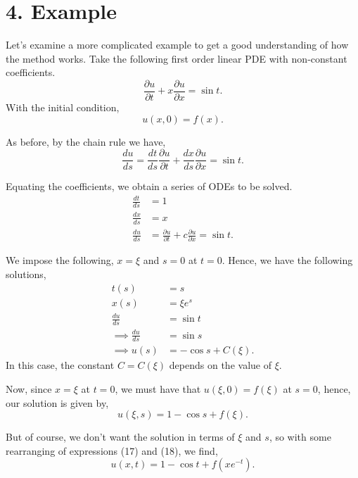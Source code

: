 \documentclass[11pt]{article}
\begin{document}
\section*{4. Example}
Let's examine a more complicated example to get a good understanding of how the method works. Take the following first order linear PDE with non-constant coefficients.
\begin{equation}
    \frac{\partial u}{\partial t} + x \frac{\partial u}{\partial x} = \sin t.
\end{equation}
With the initial condition,
\begin{equation}
    u(x,0) = f(x).
\end{equation}

As before, by the chain rule we have,
\begin{equation}
    \frac{du}{ds} = \frac{dt}{ds} \frac{\partial u}{\partial t} + \frac{dx}{ds} \frac{\partial u}{\partial x} = \sin t.
\end{equation}

Equating the coefficients, we obtain a series of ODEs to be solved.
\begin{align}
    \frac{dt}{ds} &= 1 \\
    \frac{dx}{ds} &= x \\
    \frac{du}{ds} &= \frac{\partial u}{\partial t} + c \frac{\partial u}{\partial x} = \sin t.
\end{align}

We impose the following, $x= \xi$ and $s=0$ at $t=0$. Hence, we have the following solutions,
\begin{align}
    t(s) &= s \\
    x(s) &= \xi e^s \\
    \frac{du}{ds} &= \sin t \\
    \implies \frac{du}{ds} &= \sin s \\
    \implies u(s) &= -\cos s + C(\xi).
\end{align}
In this case, the constant $C = C(\xi)$ depends on the value of $\xi$.

Now, since $x = \xi$ at $t=0$, we must have that $u(\xi,0) = f(\xi)$ at $s=0$, hence, our solution is given by,
\begin{equation}
    u(\xi,s) = 1 - \cos s + f(\xi). 
\end{equation}

But of course, we don't want the solution in terms of $\xi$ and $s$, so with some rearranging of expressions (17) and (18), we find,
\begin{equation}
    u(x,t) = 1 - \cos t + f(xe^{-t}).
\end{equation}
\end{document}
